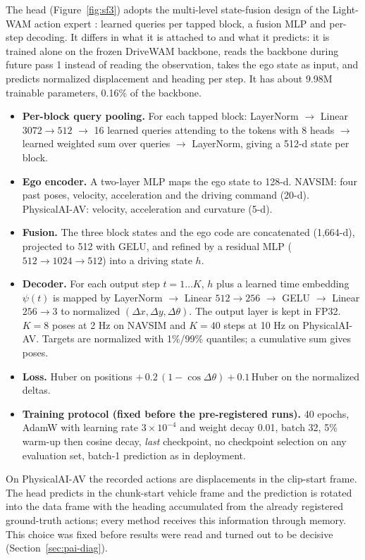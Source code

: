 \documentclass[10pt]{article}
\begin{document}
The head (Figure~\ref{fig:sf3}) adopts the multi-level state-fusion design of the Light-WAM action expert \citep{li2026lightwam}: learned queries per tapped block, a fusion MLP and per-step decoding. It differs in what it is attached to and what it predicts: it is trained alone on the frozen DriveWAM backbone, reads the backbone during future pass 1 instead of reading the observation, takes the ego state as input, and predicts normalized displacement and heading per step. It has about 9.98M trainable parameters, 0.16\% of the backbone.
\begin{itemize}
\item \textbf{Per-block query pooling.} For each tapped block: LayerNorm $\rightarrow$ Linear $3072 \rightarrow 512$ $\rightarrow$ 16 learned queries attending to the tokens with 8 heads $\rightarrow$ learned weighted sum over queries $\rightarrow$ LayerNorm, giving a 512-d state per block.
\item \textbf{Ego encoder.} A two-layer MLP maps the ego state to 128-d. NAVSIM: four past poses, velocity, acceleration and the driving command (20-d). PhysicalAI-AV: velocity, acceleration and curvature (5-d).
\item \textbf{Fusion.} The three block states and the ego code are concatenated (1,664-d), projected to 512 with GELU, and refined by a residual MLP ($512 \rightarrow 1024 \rightarrow 512$) into a driving state $h$.
\item \textbf{Decoder.} For each output step $t = 1 \dots K$, $h$ plus a learned time embedding $\psi(t)$ is mapped by LayerNorm $\rightarrow$ Linear $512 \rightarrow 256$ $\rightarrow$ GELU $\rightarrow$ Linear $256 \rightarrow 3$ to normalized $(\Delta x, \Delta y, \Delta\theta)$. The output layer is kept in FP32. $K = 8$ poses at 2 Hz on NAVSIM and $K = 40$ steps at 10 Hz on PhysicalAI-AV. Targets are normalized with 1\%/99\% quantiles; a cumulative sum gives poses.
\item \textbf{Loss.} Huber on positions $+\,0.2\,(1 - \cos\Delta\theta) + 0.1\,$Huber on the normalized deltas.
\item \textbf{Training protocol (fixed before the pre-registered runs).} 40 epochs, AdamW with learning rate $3 \times 10^{-4}$ and weight decay 0.01, batch 32, 5\% warm-up then cosine decay, \emph{last} checkpoint, no checkpoint selection on any evaluation set, batch-1 prediction as in deployment.
\end{itemize}
On PhysicalAI-AV the recorded actions are displacements in the clip-start frame. The head predicts in the chunk-start vehicle frame and the prediction is rotated into the data frame with the heading accumulated from the already registered ground-truth actions; every method receives this information through memory. This choice was fixed before results were read and turned out to be decisive (Section~\ref{sec:pai-diag}).
\end{document}
